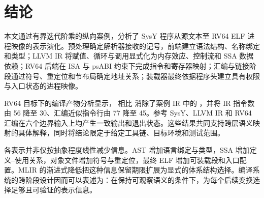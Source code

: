 \section{结论}
\label{sec:conclusion}

本文通过有界迭代阶乘的纵向案例，分析了 SysY 程序从源文本至 RV64 ELF 进程映像的表示演化。预处理确定解析器接收的记号，前端建立语法结构、名称绑定和类型；LLVM IR 将赋值、循环与调用显式化为内存效应、控制流和 SSA 数据依赖；RV64 后端在 ISA 与 psABI 约束下完成指令和寄存器映射；汇编与链接阶段通过符号、重定位和节布局确定地址关系；装载器最终依据程序头建立具有权限与入口状态的进程映像。

RV64 目标下的编译产物分析显示， 相比  消除了案例 IR 中的 ，并将 IR 指令数由 56 降至 30、汇编近似指令行由 77 降至 45。参考 SysY、LLVM IR 和 RV64 汇编在六个边界输入上均产生一致输出和退出状态。这些结果共同支持跨层语义映射的具体解释，同时将结论限定于给定工具链、目标环境和测试范围。

各表示并非仅按抽象程度线性减少信息。AST 增加语言绑定与类型，SSA 增加定义--使用关系，对象文件增加符号与重定位，最终 ELF 增加可装载段和入口配置。MLIR 的渐进式降低把这种信息保留期限扩展为显式的体系结构选择。编译系统的跨阶段设计因而可以表述为：在保持可观察语义的条件下，为每个后续变换选择足够且可验证的表示信息。
